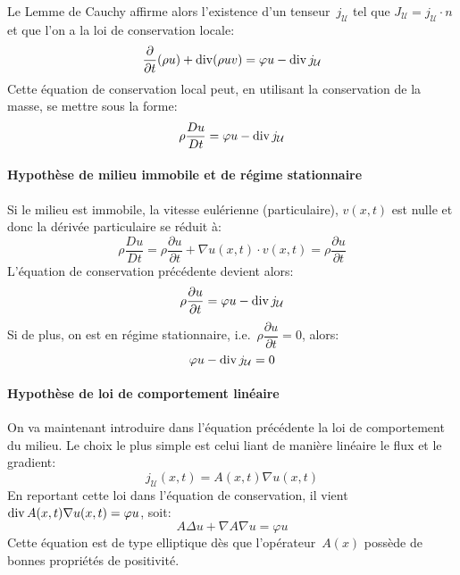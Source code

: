 Le Lemme de Cauchy affirme alors l'existence d'un tenseur~$j_{\mathcal{U}}$ tel que 
$J_{\mathcal{U}} = j_{\mathcal{U}}\cdot n$ et que l'on a la loi de conservation locale:
\begin{equation}\dfrac\partial{\partial t}(\rho u) + \operatorname{div} (\rho uv) = \varphi u-\operatorname{div} j_{\mathcal{U}}\end{equation}
Cette équation de conservation local peut, en utilisant la conservation de la masse,
se mettre sous la forme:
\begin{equation}
\rho \dfrac{Du}{Dt} = \varphi u-\operatorname{div} j_{\mathcal{U}}
\end{equation}

\medskip
\paragraph{Hypothèse de milieu immobile et de régime stationnaire}
Si le milieu est immobile, la vitesse eulérienne (particulaire), $v(x, t)$ est nulle et donc 
la dérivée particulaire se réduit à:
\begin{equation}\rho\dfrac{Du}{Dt}=\rho\dfrac{\partial u}{\partial t}+\nabla u(x,t)\cdot v(x,t)=\rho\dfrac{\partial u}{\partial t}\end{equation}
L'équation de conservation précédente devient alors:
\begin{equation}
\rho \dfrac{\partial u}{\partial t} = \varphi u-\operatorname{div} j_{\mathcal{U}}
\end{equation}
Si de plus, on est en régime stationnaire, i.e.~$\rho \dfrac{\partial u}{\partial t} =0$, alors:
\begin{equation}
\varphi u-\operatorname{div} j_{\mathcal{U}} =0
\end{equation}

\medskip
\paragraph{Hypothèse de loi de comportement linéaire}
On va maintenant introduire dans l'équation précédente la loi de comportement
du milieu.
Le choix le plus simple est celui liant de manière linéaire le flux et le gradient:
\begin{equation}
j_{\mathcal{U}}(x,t)=A(x,t)\nabla u(x,t)
\end{equation}
En reportant cette loi dans l'équation de conservation, il vient~$\operatorname{div} A(x,t)\nabla u(x,t)=\varphi u$,
soit:
\begin{equation}
A \Delta u + \nabla A \nabla u = \varphi u
\end{equation}
Cette équation est de type elliptique dès que l'opérateur~$A(x)$ possède de
bonnes propriétés de positivité.

